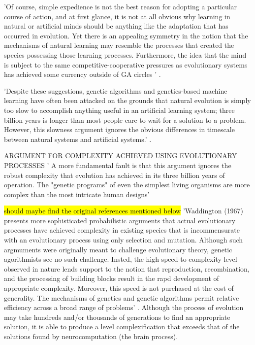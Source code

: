 'Of course, simple expedience is not the best reason for adopting a particular course of action, and at first glance, it is not at all obvious why learning in natural or artificial minds should be anything like the adaptation that has occurred in evolution. Yet there is an appealing symmetry in the notion that the mechanisms of natural learning may resemble the processes that created the species possessing those learning processes. Furthermore, the idea that the mind is subject to the same competitive-cooperative pressures as evolutionary systems has achieved some currency outside of GA circles ' \cite{goldberg1988genetic}.

'Despite these suggestions, genetic algorithms and genetics-based machine learning have often been attacked on the grounds that natural evolution is simply too slow to accomplish anything useful in an artificial learning system; three billion years is longer than most people care to wait for a solution to a problem. However, this slowness argument ignores the obvious differences in timescale between natural systems and artificial systems.' \cite{goldberg1988genetic}.

ARGUMENT FOR COMPLEXITY ACHIEVED USING EVOLUTIONARY PROCESSES
' A more fundamental fault is that this argument ignores the robust complexity that evolution has achieved in its three billion years of operation. The "genetic programs" of even the simplest living organisms are more complex than the most intricate human designs' \cite{goldberg1988genetic}

\hl{should maybe find the original references mentioned below}
'Waddington (1967) presents more sophisticated probabilistic arguments that actual evolutionary processes have achieved complexity in existing species that is incommensurate with an evolutionary process using only selection and mutation. Although such argmuments were originally meant to challenge evolutionary theory, genetic agorithmists see no such challenge. Insted, the high speed-to-complexity level observed in nature lends support to the notion that reproduction, recombination, and the processing of building blocks result in the rapd development of appropriate complexity. Moreover, this speed is not purchased at the cost of generality. The mechanisms of genetics and genetic algorithms permit relative efficiency across a broad range of problems' \cite{goldberg1988genetic}.
Although the process of evolution may take hundreds and/or thousands of generations to find an appropriate solution, it is able to produce a level complexification that exceeds that of the solutions found by neurocomputation (the brain process).


